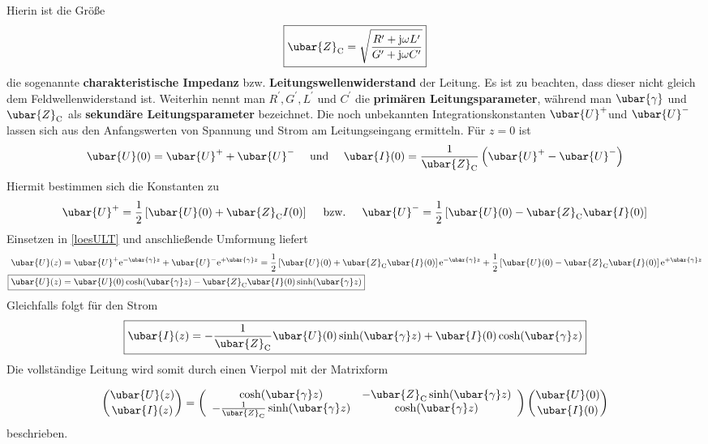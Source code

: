 Hierin ist die Größe
\begin{equation}
	\boxed{\ubar{Z}_{\mathrm{C}}=\sqrt{\frac{R^{\prime}+\mathrm{j} \omega L^{\prime}}{G^{\prime}+\mathrm{j} \omega C^{\prime}}} }
\end{equation}
die sogenannte \textbf{charakteristische Impedanz} bzw. \textbf{Leitungswellenwiderstand} der Leitung. Es ist zu beachten, dass dieser nicht gleich dem Feldwellenwiderstand ist. Weiterhin nennt man $R^{\prime}, G^{\prime}, L^{\prime}$ und $C^{\prime}$ die \textbf{primären Leitungsparameter}, während man $\ubar{\gamma}$ und $\ubar{Z}_{\mathrm{C}}$ als \textbf{sekundäre Leitungsparameter} bezeichnet.
Die noch unbekannten Integrationskonstanten $\ubar{U}^{+}$und $\ubar{U}^{-}$lassen sich aus den Anfangswerten von Spannung und Strom am Leitungseingang ermitteln. Für $z=0$ ist
\begin{equation}
	\ubar{U}(0)=\ubar{U}^{+}+\ubar{U}^{-} \quad \text { und } \quad \ubar{I}(0)=\frac{1}{\ubar{Z}_{\mathrm{C}}}\left(\ubar{U}^{+}-\ubar{U}^{-}\right)
\end{equation}
Hiermit bestimmen sich die Konstanten zu
\begin{equation}
	\ubar{U}^{+}=\frac{1}{2}\left[\ubar{U}(0)+\ubar{Z}_{\mathrm{C}} I(0)\right] \quad \text { bzw. } \quad \ubar{U}^{-}=\frac{1}{2}\left[\ubar{U}(0)-\ubar{Z}_{\mathrm{C}} \ubar{I}(0)\right] 
\end{equation}
Einsetzen in \ref{loesULT} und anschließende Umformung liefert
\begin{align}
	\ubar{U}(z) & =\ubar{U}^{+} \mathrm{e}^{-\ubar{\gamma} z}+\ubar{U}^{-} \mathrm{e}^{+\ubar{\gamma} z}=\frac{1}{2}\left[\ubar{U}(0)+\ubar{Z}_{\mathrm{C}} \ubar{I}(0)\right] \mathrm{e}^{-\ubar{\gamma} z}+\frac{1}{2}\left[\ubar{U}(0)-\ubar{Z}_{\mathrm{C}} \ubar{I}(0)\right] \mathrm{e}^{+\ubar{\gamma} z}  \\
	\Aboxed{\ubar{U}(z)& =\ubar{U}(0) \cosh (\ubar{\gamma} z)-\ubar{Z}_{\mathrm{C}} \ubar{I}(0) \sinh (\ubar{\gamma} z) }
\end{align}
Gleichfalls folgt für den Strom
\begin{equation}
	\boxed{\ubar{I}(z)=-\frac{1}{\ubar{Z}_{\mathrm{C}}} \ubar{U}(0) \sinh (\ubar{\gamma} z)+\ubar{I}(0) \cosh (\ubar{\gamma} z)}
\end{equation}
Die vollständige Leitung wird somit durch einen Vierpol mit der Matrixform

\begin{equation}
\binom{\ubar{U}(z)}{\ubar{I}(z)}=\left(\begin{array}{cc}
	\cosh (\ubar{\gamma} z) & -\ubar{Z}_{\mathrm{C}} \sinh (\ubar{\gamma} z)  \\
	-\frac{1}{\ubar{Z}_{\mathrm{C}}} \sinh (\ubar{\gamma} z) & \cosh (\ubar{\gamma} z)
\end{array}\right)\binom{\ubar{U}(0)}{\ubar{I}(0)}
\end{equation}
beschrieben. 
